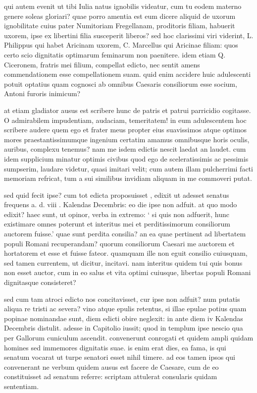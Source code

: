  qui autem evenit ut tibi Iulia natus ignobilis videatur, cum tu eodem materno genere soleas gloriari? quae porro amentia est eum dicere aliquid de uxorum ignobilitate cuius pater Numitoriam Fregellanam, proditoris filiam, habuerit uxorem, ipse ex libertini filia susceperit liberos? sed hoc clarissimi viri viderint, L. Philippus qui habet Aricinam uxorem, C. Marcellus qui Aricinae filiam: quos certo scio dignitatis optimarum feminarum non paenitere. idem etiam Q. Ciceronem, fratris mei filium, compellat edicto, nec sentit amens commendationem esse compellationem suam. quid enim accidere huic adulescenti potuit optatius quam cognosci ab omnibus Caesaris consiliorum esse socium, Antoni furoris inimicum?

 at etiam gladiator ausus est scribere hunc de patris et patrui parricidio cogitasse. O admirabilem impudentiam, audaciam, temeritatem! in eum adulescentem hoc scribere audere quem ego et frater meus propter eius suavissimos atque optimos mores praestantissimumque ingenium certatim amamus omnibusque horis oculis, auribus, complexu tenemus? nam me isdem edictis nescit laedat an laudet. cum idem supplicium minatur optimis civibus quod ego de sceleratissimis ac pessimis sumpserim, laudare videtur, quasi imitari velit; cum autem illam pulcherrimi facti memoriam refricat, tum a sui similibus invidiam aliquam in me commoveri putat.

 sed quid fecit ipse? cum tot edicta proposuisset , edixit ut adesset senatus frequens a. d. viii . Kalendas Decembris: eo die ipse non adfuit. at quo modo edixit? haec sunt, ut opinor, verba in extremo: ` si quis non adfuerit, hunc existimare omnes poterunt et interitus mei et perditissimorum consiliorum auctorem fuisse.' quae sunt perdita consilia? an ea quae pertinent ad libertatem populi Romani recuperandam? quorum consiliorum Caesari me auctorem et hortatorem et esse et fuisse fateor. quamquam ille non eguit consilio cuiusquam, sed tamen currentem, ut dicitur, incitavi. nam interitus quidem tui quis bonus non esset auctor, cum in eo salus et vita optimi cuiusque, libertas populi Romani dignitasque consisteret?

 sed cum tam atroci edicto nos concitavisset, cur ipse non adfuit? num putatis aliqua re tristi ac severa? vino atque epulis retentus, si illae epulae potius quam popinae nominandae sunt, diem edicti obire neglexit: in ante diem iv Kalendas Decembris distulit. adesse in Capitolio iussit; quod in templum ipse nescio qua per Gallorum cuniculum ascendit. convenerunt conrogati et quidem ampli quidam homines sed immemores dignitatis suae. is enim erat dies, ea fama, is qui senatum vocarat ut turpe senatori esset nihil timere. ad eos tamen ipsos qui convenerant ne verbum quidem ausus est facere de Caesare, cum de eo constituisset ad senatum referre: scriptam attulerat consularis quidam sententiam.

